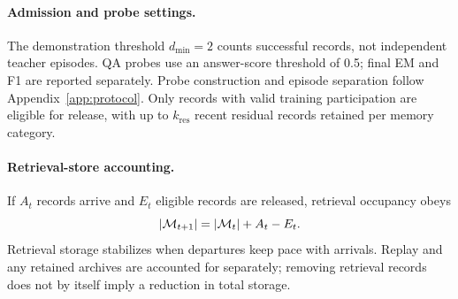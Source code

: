 \paragraph{Admission and probe settings.}
The demonstration threshold $d_{\min}=2$ counts successful records, not independent teacher episodes. QA probes use an answer-score threshold of 0.5; final EM and F1 are reported separately. Probe construction and episode separation follow Appendix~\ref{app:protocol}. Only records with valid training participation are eligible for release, with up to $k_{\mathrm{res}}$ recent residual records retained per memory category.

\paragraph{Retrieval-store accounting.}
If $A_t$ records arrive and $E_t$ eligible records are released, retrieval occupancy obeys
\begin{equation}
|\mathcal{M}_{t+1}|=|\mathcal{M}_t|+A_t-E_t.
\label{eq:occupancy}
\end{equation}
Retrieval storage stabilizes when departures keep pace with arrivals. Replay and any retained archives are accounted for separately; removing retrieval records does not by itself imply a reduction in total storage.
